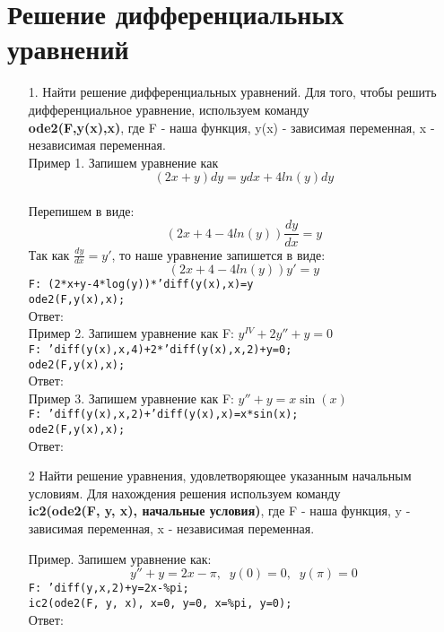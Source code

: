 \documentclass[article, bachelor, och, pract]{SCWorks}
\begin{document}
\section{Решение дифференциальных уравнений}
\begin{itemize}
\item[1.] Найти решение дифференциальных уравнений. Для того, чтобы решить дифференциальное уравнение, используем команду\\
\textbf{ode2(F,y(x),x)}, где F - наша функция, y(x) - зависимая переменная, x - независимая переменная.\\

Пример 1. Запишем уравнение как $$(2x+y)dy = ydx +4ln(y)dy$$\\
Перепишем в виде: $$(2x+4-4ln(y))\frac{dy}{dx}=y$$
Так как $\frac{dy}{dx} = y'$, то наше уравнение запишется в виде:
$$(2x+4-4ln(y))y'=y$$
\texttt{F: (2*x+y-4*log(y))*'diff(y(x),x)=y}\\
\texttt{ode2(F,y(x),x);}\\
Ответ: \\
Пример 2. Запишем уравнение как F: $y^{IV}+2y''+y=0$\\
\texttt{F: 'diff(y(x),x,4)+2*'diff(y(x),x,2)+y=0;}\\
\texttt{ode2(F,y(x),x);}\\
Ответ: \\
Пример 3. Запишем уравнение как F: $y''+y=x\sin(x) $\\
\texttt{F: 'diff(y(x),x,2)+'diff(y(x),x)=x*sin(x);}\\
\texttt{ode2(F,y(x),x);}\\
Ответ: 

\item[2] Найти решение уравнения, удовлетворяющее указанным начальным условиям. Для нахождения решения используем команду \\ \textbf{ic2(ode2(F, y, x), начальные условия)}, где F - наша функция, y - зависимая переменная, x - независимая переменная.

Пример. Запишем уравнение как:
$$y''+y=2x-\pi, \;\; y(0)=0, \;\; y(\pi)=0$$
\texttt{F: 'diff(y,x,2)+y=2x-\%pi;}\\
\texttt{ic2(ode2(F, y, x), x=0, y=0, x=\%pi, y=0);}\\
Ответ: 


\end{itemize}
\end{document}
